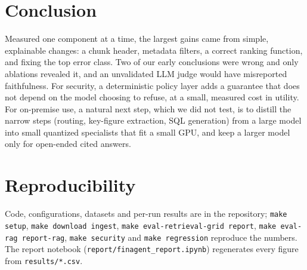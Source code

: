 \documentclass[10pt,a4paper]{article}
\begin{document}
\section{Conclusion}
Measured one component at a time, the largest gains came from simple, explainable changes: a chunk header,
metadata filters, a correct ranking function, and fixing the top error class. Two of our early conclusions were
wrong and only ablations revealed it, and an unvalidated LLM judge would have misreported faithfulness. For
security, a deterministic policy layer adds a guarantee that does not depend on the model choosing to refuse,
at a small, measured cost in utility. For on-premise use, a natural next step, which we did not test, is to
distill the narrow steps (routing, key-figure extraction, SQL generation) from a large model into small
quantized specialists that fit a small GPU, and keep a larger model only for open-ended cited answers.




\appendix
\section{Reproducibility}
Code, configurations, datasets and per-run results are in the repository; \texttt{make setup}, \texttt{make
download ingest}, \texttt{make eval-retrieval-grid report}, \texttt{make eval-rag report-rag},
\texttt{make security} and \texttt{make regression} reproduce the numbers. The report notebook
(\texttt{report/finagent\_report.ipynb}) regenerates every figure from \texttt{results/*.csv}.
\end{document}
